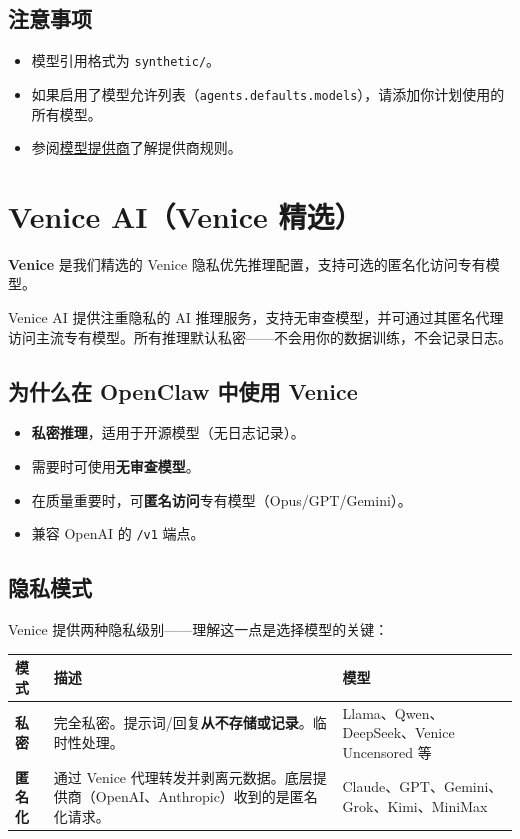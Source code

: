 \subsection{注意事项}


\begin{itemize}
  \item 模型引用格式为 \texttt{synthetic/}。
  \item 如果启用了模型允许列表（\texttt{agents.defaults.models}），请添加你计划使用的所有模型。
  \item 参阅\href{/concepts/model-providers}{模型提供商}了解提供商规则。
\end{itemize}



\clearpage

\section{Venice AI（Venice 精选）}


\textbf{Venice} 是我们精选的 Venice 隐私优先推理配置，支持可选的匿名化访问专有模型。

Venice AI 提供注重隐私的 AI 推理服务，支持无审查模型，并可通过其匿名代理访问主流专有模型。所有推理默认私密——不会用你的数据训练，不会记录日志。

\subsection{为什么在 OpenClaw 中使用 Venice}


\begin{itemize}
  \item \textbf{私密推理}，适用于开源模型（无日志记录）。
  \item 需要时可使用\textbf{无审查模型}。
  \item 在质量重要时，可\textbf{匿名访问}专有模型（Opus/GPT/Gemini）。
  \item 兼容 OpenAI 的 \texttt{/v1} 端点。
\end{itemize}


\subsection{隐私模式}


Venice 提供两种隐私级别——理解这一点是选择模型的关键：


\begin{table}[h]
\centering
\small
\begin{tabular}{|l|l|l|}
\hline
模式 & 描述 & 模型 \\
\hline
\textbf{私密} & 完全私密。提示词/回复\textbf{从不存储或记录}。临时性处理。 & Llama、Qwen、DeepSeek、Venice Uncensored 等 \\
\hline
\textbf{匿名化} & 通过 Venice 代理转发并剥离元数据。底层提供商（OpenAI、Anthropic）收到的是匿名化请求。 & Claude、GPT、Gemini、Grok、Kimi、MiniMax \\
\hline
\end{tabular}
\end{table}



